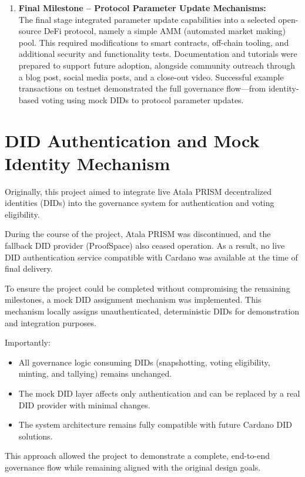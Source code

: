 \documentclass[11pt]{article}
\begin{document}
\begin{enumerate}
    \item \textbf{Final Milestone – Protocol Parameter Update Mechanisms:}\\
    The final stage integrated parameter update capabilities into a selected open-source DeFi protocol, namely a simple AMM (automated market making) pool.  
    This required modifications to smart contracts, off-chain tooling, and additional security and functionality tests.  
    Documentation and tutorials were prepared to support future adoption, alongside community outreach through a blog post, social media posts, and a close-out video.  
    Successful example transactions on testnet demonstrated the full governance flow—from identity-based voting using mock DIDs to protocol parameter updates.
\end{enumerate}

\section{DID Authentication and Mock Identity Mechanism}
Originally, this project aimed to integrate live Atala PRISM decentralized identities (DIDs) into the governance system for authentication and voting eligibility.

During the course of the project, Atala PRISM was discontinued, and the fallback DID provider (ProofSpace) also ceased operation. As a result, no live DID authentication service compatible with Cardano was available at the time of final delivery.

To ensure the project could be completed without compromising the remaining milestones, a mock DID assignment mechanism was implemented. This mechanism locally assigns unauthenticated, deterministic DIDs for demonstration and integration purposes.

Importantly:
\begin{itemize}
    \item All governance logic consuming DIDs (snapshotting, voting eligibility, minting, and tallying) remains unchanged.
    \item The mock DID layer affects only authentication and can be replaced by a real DID provider with minimal changes.
    \item The system architecture remains fully compatible with future Cardano DID solutions.
\end{itemize}

This approach allowed the project to demonstrate a complete, end-to-end governance flow while remaining aligned with the original design goals.
\end{document}
